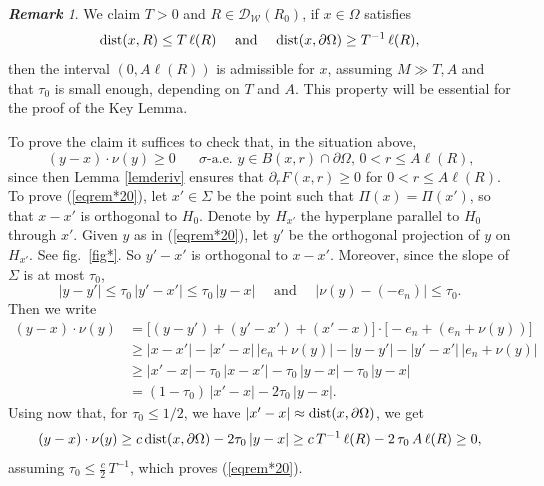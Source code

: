 \documentclass[11pt]{amsart}
\newcommand{\DD}{{\mathcal D}}
\newcommand{\WW}{{\mathcal W}}
\newcommand{\dist}{{\rm dist}}
\newcommand{\rf}[1]{{(\ref{#1})}}
\theoremstyle{definition}
\theoremstyle{remark}
\newtheorem{rem}[theorem]{\bf Remark}
\numberwithin{equation}{section}
\begin{document}
\begin{rem}\label{rem1}
We claim $T>0$ and $R\in\DD_\WW(R_0)$, if $x\in\Omega$ satisfies
$$\dist(x,R)\leq  T\,\ell(R) \quad\text{ and }\quad \dist(x,\partial \Omega)\geq T^{-1}\,\ell(R),$$
then the interval $(0,A\ell(R))$ is admissible for $x$, assuming $M\gg T,A$ and that $\tau_0$ is small enough, depending on $T$ and $A$. This property will be essential for the proof of the Key Lemma.

To prove the claim it suffices to check that, in the situation above,
\begin{equation}\label{eqrem*20}
(y-x)\cdot \nu(y)\geq 0 \quad \mbox{ $\sigma$-a.e.\ $y\in B(x,r)\cap\partial\Omega$, $0<r\leq A\ell(R)$,
}
\end{equation}
since then Lemma \ref{lemderiv} ensures that $\partial_r F(x,r)\geq0$ for $0<r\leq A\ell(R)$.
To prove \rf{eqrem*20}, let $x'\in\Sigma$ be the point such that $\Pi(x)=\Pi(x')$, so that $x-x'$ is orthogonal to $H_0$. Denote by $H_{x'}$ the hyperplane parallel to $H_0$ through $x'$. Given
$y$ as in \rf{eqrem*20}, let $y'$ be the orthogonal projection of $y$ on $H_{x'}$. See fig.\ \ref{fig*}.
So $y'-x'$ is orthogonal to $x-x'$. Moreover, since the slope of $\Sigma$ is at most $\tau_0$,
$$|y-y'|\leq \tau_0\,|y'-x'|\leq \tau_0\,|y-x|\quad \mbox{ and }\quad|\nu(y) - (-e_n)| \leq \tau_0.$$
Then we write
\begin{align*}
(y-x)\cdot \nu(y) & = \big[(y - y') + (y'-x') + (x'-x)\big] \cdot  \big[-e_n + (e_n + \nu(y))\big]\\
& \geq |x-x'| - 
|x'-x| \, |e_n+\nu(y)| - |y-y'| - |y'-x'| \,|e_n + \nu(y)| \\
& \geq  |x'-x|- \tau_0\,|x-x'|- \tau_0\,|y-x| - \tau_0\,|y-x| \\
&= (1-\tau_0)\,|x'-x| - 2\tau_0\,|y-x|.
\end{align*}
Using now that, for $\tau_0\leq 1/2$, we have $|x'-x|\approx\dist(x,\partial\Omega)$, we get
$$(y-x)\cdot \nu(y)\geq c\,\dist(x,\partial\Omega) -2\tau_0\,|y-x|
\geq c\,T^{-1}\,\ell(R) - 2 \,\tau_0\,A\,\ell(R)\geq0,$$
assuming $\tau_0\leq \frac c2\,T^{-1}$, which proves \rf{eqrem*20}.
\end{rem}
\end{document}
